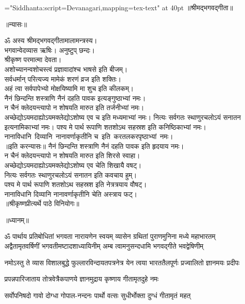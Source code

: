 \centerline{\font\x="Siddhanta:script=Devanagari,mapping=tex-text" at 40pt \x ॥श्रीमद्भगवद्गीता॥}
\bigskip
\centerline{\Large ॥न्यासः॥}
\medskip
{}
ॐ अस्य श्रीमद्भगवद्गीतामालामन्त्रस्य।\\ 
भगवान्वेदव्यास ऋषिः। अनुष्टुप् छन्दः।\\
श्रीकृष्ण परमात्मा देवता।\\
अशोच्यानन्वशोचस्त्वं प्रज्ञावादांश्च भाषसे इति बीजम्।\\
सर्वधर्मान् परित्यज्य मामेकं शरणं व्रज इति शक्तिः।\\
अहं त्वा सर्वपापेभ्यो मोक्षयिष्यामि मा शुच इति कीलकम्।\\
नैनं छिन्दन्ति शस्त्राणि नैनं दहति पावक इत्यङ्गुष्ठाभ्यां नमः।\\
न चैनं क्लेदयन्त्यापो न शोषयति मारुत इति तर्जनीभ्यां नमः।\\
अच्छेद्योऽयमदाह्योऽयमक्लेद्योऽशोष्य एव च इति मध्यमाभ्यां नमः। नित्यः सर्वगतः स्थाणुरचलोऽयं सनातन इत्यनामिकाभ्यां नमः। पश्य मे पार्थ रूपाणि शतशोऽथ सहस्रश इति कनिष्ठिकाभ्यां नमः। नानाविधानि~दिव्यानि~नानावर्णाकृतीनि च~इति~करतलकरपृष्ठाभ्यां~नमः।\\
{॥इति करन्यासः॥}
\medskip
\newpage
{}
नैनं छिन्दन्ति शस्त्राणि नैनं दहति पावक इति हृदयाय नमः।\\
न चैनं क्लेदयन्त्यापो न शोषयति मारुत इति शिरसे स्वाहा।\\
अच्छेद्योऽयमदाह्योऽयमक्लेद्योऽशोष्य एव चेति शिखायै वषट्।\\
नित्यः सर्वगतः स्थाणुरचलोऽयं सनातन इति कवचाय हुम्।\\
पश्य मे पार्थ रूपाणि शतशोऽथ सहस्रश इति नेत्रत्रयाय वौषट्।\\
नानाविधानि दिव्यानि नानावर्णाकृतीनि चेति अस्त्राय फट्।\\
{॥श्रीकृष्णप्रीत्यर्थे पाठे विनियोगः॥}
\vfill
\centerline{\Large ॥ध्यानम्॥}
\fourlineindentedshloka
{ॐ पार्थाय प्रतिबोधितां भगवता नारायणेन स्वयम्}
{व्यासेन ग्रथितां पुराणमुनिना मध्ये महाभारतम्}
{अद्वैतामृतवर्षिणीं भगवतीमष्टादशाध्यायिनीम्}
{अम्ब त्वामनुसन्दधामि भगवद्गीते भवद्वेषिणीम्}%

\twolineshloka
{नमोऽस्तु ते व्यास विशालबुद्धे फुल्लारविन्दायतपत्रनेत्र}
{येन त्वया भारततैलपूर्णः प्रज्वालितो ज्ञानमयः प्रदीपः}%

\twolineshloka
{प्रपन्नपारिजाताय तोत्रवेत्रैकपाणये}
{ज्ञानमुद्राय कृष्णाय गीतामृतदुहे नमः}%

\twolineshloka
{सर्वोपनिषदो गावो दोग्धा गोपाल-नन्दनः}
{पार्थो वत्सः सुधीर्भोक्ता दुग्धं गीतामृतं महत्}%

